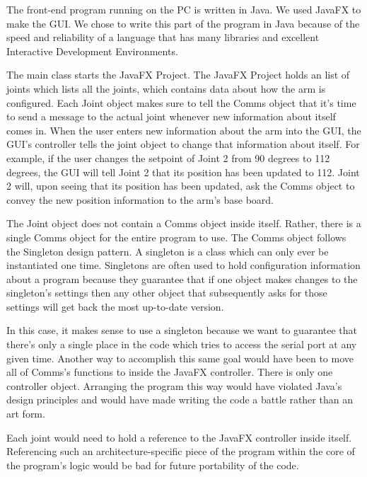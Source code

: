 \noindent The front-end program running on the PC is written in Java. We used JavaFX to make the GUI. We chose to write this part of the program in Java because of the speed and reliability of a language that has many libraries and excellent Interactive Development Environments.  

\noindent The main class starts the JavaFX Project. The JavaFX Project holds an list of joints which lists all the joints, which contains data about how the arm is configured. Each Joint object makes sure to tell the Comms object that it's time to send a message to the actual joint whenever new information about itself comes in. When the user enters new information about the arm into the GUI, the GUI's controller tells the joint object to change that information about itself. For example, if the user changes the setpoint of Joint 2 from 90 degrees to 112 degrees, the GUI will tell Joint 2 that its position has been updated to 112. Joint 2 will, upon seeing that its position has been updated, ask the Comms object to convey the new position information to the arm's base board.

\noindent The Joint object does not contain a Comms object inside itself. Rather, there is a single Comms object for the entire program to use. The Comms object follows the Singleton design pattern. A singleton is a class which can only ever be instantiated one time. Singletons are often used to hold configuration information about a program because they guarantee that if one object makes changes to the singleton's settings then any other object that subsequently asks for those settings will get back the most up-to-date version.

\noindent In this case, it makes sense to use a singleton because we want to guarantee that there's only a single place in the code which tries to access the serial port at any given time. Another way to accomplish this same goal would have been to move all of Comms's functions to inside the JavaFX controller. There is only one controller object. Arranging the program this way would have violated Java's design principles and would have made writing the code a battle rather than an art form. %

\noindent Each joint would need to hold a reference to the JavaFX controller inside itself. Referencing such an architecture-specific piece of the program within the core of the program's logic would be bad for future portability of the code. 

